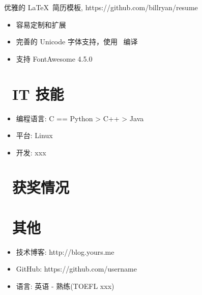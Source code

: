 \documentclass{resume}
\begin{document}
\begin{onehalfspacing}
优雅的 \LaTeX\ 简历模板, https://github.com/billryan/resume
\begin{itemize}
  \item 容易定制和扩展
  \item 完善的 Unicode 字体支持，使用 \XeLaTeX\ 编译
  \item 支持 FontAwesome 4.5.0
\end{itemize}
\end{onehalfspacing}


\section{\faCogs \fangzheng \ IT 技能}
\begin{itemize}[parsep=0.5ex]
  \item 编程语言: C == Python > C++ > Java
  \item 平台: Linux
  \item 开发: xxx
\end{itemize}

\section{\faHeart \fangzheng \ 获奖情况}

\section{\faInfo \fangzheng \ 其他}
\begin{itemize}[parsep=0.5ex]
  \item 技术博客: http://blog.yours.me
  \item GitHub: https://github.com/username
  \item 语言: 英语 - 熟练(TOEFL xxx)
\end{itemize}

%
%
\end{document}
